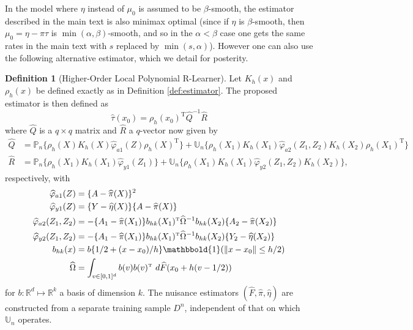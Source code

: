 \documentclass[11pt,twoside]{article}
\def\T{{ \mathrm{\scriptscriptstyle T} }}
\newcommand{\Pn}{\mathbb{P}_n}
\newcommand{\Un}{\mathbb{U}_n}
\newcommand{\R}{\mathbb{R}}
\newcommand{\one}{\mathbbold{1}}
\theoremstyle{definition}
\newtheorem{definition}{Definition}
\theoremstyle{remark}
\begin{document}
In the model where $\eta$ instead of $\mu_0$ is assumed to be $\beta$-smooth, the estimator described in the main text is also minimax optimal (since if $\eta$ is $\beta$-smooth, then $\mu_0=\eta - \pi \tau  $ is $\min(\alpha,\beta)$-smooth, and so in the $\alpha < \beta$ case one gets the same rates in the main text with $s$ replaced by $\min(s,\alpha)$). However one can also use the following alternative estimator, which we detail for posterity. \\

\begin{definition}[Higher-Order Local Polynomial R-Learner] \label{def:estimator2} 
Let $K_h(x)$ and $\rho_h(x)$ be defined exactly as in Definition \ref{def:estimator}. 
The proposed estimator is then defined as
\begin{equation} \label{eq:estimator2}
\widehat\tau(x_0) = \rho_h(x_0)^\T \widehat{Q}^{-1} \widehat{R} 
\end{equation}
where $\widehat{Q}$ is a $q \times q$ matrix and $\widehat{R}$ a $q$-vector now given by
\begin{align*}
\widehat{Q} &= \Pn \Big\{  \rho_h(X) K_h(X)\widehat\varphi_{a1}(Z)  \rho_h(X)^\T  \Big\} + \Un \Big\{ \rho_h(X_1) K_h(X_1) \widehat\varphi_{a2}(Z_1,Z_2) K_h(X_2) \rho_h(X_1)^\T \Big\} \\
\widehat{R} &=  \Pn \Big\{  \rho_h(X_1) K_h(X_1)  \widehat\varphi_{y1}(Z_1) \Big\} + \Un \Big\{  \rho_h(X_1) K_h(X_1) \widehat\varphi_{y2}(Z_1,Z_2) K_h(X_2) \Big\} , 
\end{align*}
respectively, with 
\begin{align*}
\widehat\varphi_{a1}(Z) &= \{A-\widehat\pi(X)\}^2 \\
\widehat\varphi_{y1}(Z) &= \{Y - \widehat\eta(X) \} \{A-\widehat\pi(X)\} \\
\widehat\varphi_{a2}(Z_1,Z_2) &= -\{A_1 - \widehat\pi(X_1)\} b_{hk}(X_1)^\T \widehat\Omega^{-1} b_{hk}(X_2) \{A_2 - \widehat\pi(X_2)\} \\
\widehat\varphi_{y2}(Z_1,Z_2) &= -\{A_1 - \widehat\pi(X_1)\} b_{hk}(X_1)^\T \widehat\Omega^{-1} b_{hk}(X_2) \{Y_2 - \widehat\eta(X_2)\}  \\
b_{hk}(x) &=  b\{1/2 + (x-x_0)/h\} \one(\|x-x_0 \| \leq h/2) \\
\widehat\Omega &= \int_{v \in [0,1]^d} b(v) b(v)^\T \ d\widehat{F}(x_0 + h(v-1/2)) 
\end{align*}
for $b: \R^d \mapsto \R^k$ a basis of dimension $k$. 
The nuisance estimators $( \widehat{F}, \widehat\pi,\widehat\eta)$ are constructed from a separate training sample $D^n$, independent of that on which $\Un$ operates. \\
\end{definition}
\end{document}
